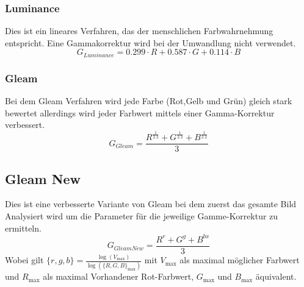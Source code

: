 \subsubsection{Luminance}
Dies ist ein lineares Verfahren, das der menschlichen Farbwahrnehmung entspricht. Eine Gammakorrektur wird bei der Umwandlung nicht verwendet.
\[G_{Luminance} = 0.299 \cdot R + 0.587 \cdot G + 0.114 \cdot B\]
\subsubsection{Gleam}
Bei dem Gleam Verfahren wird jede Farbe (Rot,Gelb und Grün) gleich stark bewertet allerdings wird jeder Farbwert mittels einer Gamma-Korrektur verbessert.
\[G_{Gleam}=\dfrac{R^{\frac{1}{2.2}} + G^{\frac{1}{2.2}} + B^{\frac{1}{2.2}}}{3}\]
\subsection{Gleam New}
Dies ist eine verbesserte Variante von Gleam bei dem zuerst das gesamte Bild Analysiert wird um die Parameter für die jeweilige Gamme-Korrektur zu ermitteln.
\[G_{Gleam New}=\dfrac{R^{r} + G^{g} + B^{bx}}{3}\]
Wobei gilt $\{r,g,b\} = \frac{\log(V_{\max})}{\log(\{R,G,B\}_{\max})}$ mit $V_{\max}$ als maximal möglicher Farbwert und $R_{\max}$ als maximal Vorhandener Rot-Farbwert, $G_{\max}$ und $B_{\max}$ äquivalent.
